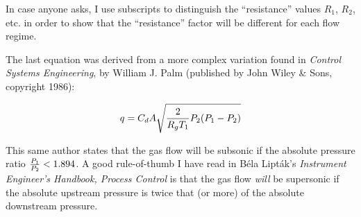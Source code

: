 
In case anyone asks, I use subscripts to distinguish the ``resistance'' values $R_1$, $R_2$, etc. in order to show that the ``resistance'' factor will be different for each flow regime.

\vskip 10pt

The last equation was derived from a more complex variation found in {\it Control Systems Engineering}, by William J. Palm (published by John Wiley \& Sons, copyright 1986):

$$q = C_d A \sqrt{{ 2 \over {R_g T_1}} P_2(P_1 - P_2)}$$

This same author states that the gas flow will be subsonic if the absolute pressure ratio ${P_1 \over P_2} < 1.894$.  A good rule-of-thumb I have read in B\'ela Lipt\'ak's {\it Instrument Engineer's Handbook, Process Control} is that the gas flow {\it will} be supersonic if the absolute upstream pressure is twice that (or more) of the absolute downstream pressure.




